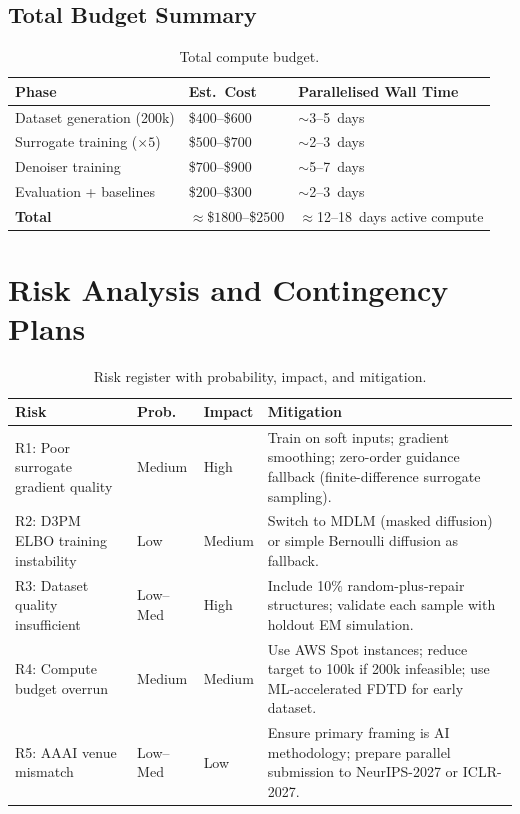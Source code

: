 \documentclass[12pt,a4paper]{article}
\theoremstyle{definition}
\theoremstyle{plain}
\theoremstyle{remark}
\begin{document}
\subsection{Total Budget Summary}

\begin{table}[H]
\centering
\caption{Total compute budget.}
\label{tab:compute_total}
\begin{tabular}{lll}
\toprule
\textbf{Phase} & \textbf{Est.\ Cost} & \textbf{Parallelised Wall Time} \\
\midrule
Dataset generation (200k)   & \$$400$--\$$600$   & $\sim$3--5~days \\
Surrogate training ($\times5$) & \$$500$--\$$700$ & $\sim$2--3~days \\
Denoiser training           & \$$700$--\$$900$   & $\sim$5--7~days \\
Evaluation + baselines      & \$$200$--\$$300$   & $\sim$2--3~days \\
\midrule
\textbf{Total}              & $\approx$\$$1800$--\$$2500$
                            & $\approx$12--18~days active compute \\
\bottomrule
\end{tabular}
\end{table}

\section{Risk Analysis and Contingency Plans}
\label{sec:risks}

\begin{table}[H]
\centering
\caption{Risk register with probability, impact, and mitigation.}
\label{tab:risks}
\begin{tabularx}{\linewidth}{lllX}
\toprule
\textbf{Risk} & \textbf{Prob.} & \textbf{Impact} & \textbf{Mitigation} \\
\midrule
R1: Poor surrogate gradient quality
  & Medium & High
  & Train on soft inputs; gradient smoothing;
    zero-order guidance fallback
    (finite-difference surrogate sampling). \\
\addlinespace
R2: D3PM ELBO training instability
  & Low & Medium
  & Switch to MDLM (masked diffusion) or simple
    Bernoulli diffusion as fallback. \\
\addlinespace
R3: Dataset quality insufficient
  & Low--Med & High
  & Include 10\% random-plus-repair structures;
    validate each sample with holdout EM simulation. \\
\addlinespace
R4: Compute budget overrun
  & Medium & Medium
  & Use AWS Spot instances;
    reduce target to 100k if 200k infeasible;
    use ML-accelerated FDTD for early dataset. \\
\addlinespace
R5: AAAI venue mismatch
  & Low--Med & Low
  & Ensure primary framing is AI methodology;
    prepare parallel submission to NeurIPS-2027
    or ICLR-2027. \\
\bottomrule
\end{tabularx}
\end{table}
\end{document}

